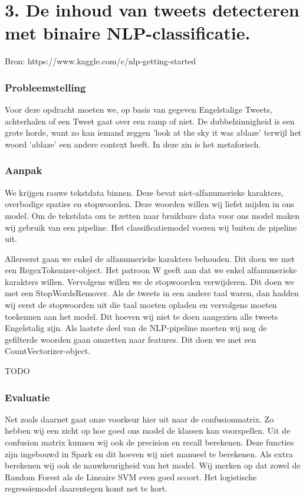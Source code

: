 \documentclass[a4paper,12pt,twoside]{report}
\begin{document}
\chapter*{3. De inhoud van tweets detecteren met binaire NLP-classificatie.}

Bron: https://www.kaggle.com/c/nlp-getting-started

\subsection*{Probleemstelling}

Voor deze opdracht moeten we, op basis van gegeven Engelstalige Tweets, achterhalen of een Tweet gaat over een ramp of niet. De dubbelzinnigheid is een grote horde, want zo kan iemand zeggen 'look at the sky it was ablaze' terwijl het woord 'ablaze' een andere context heeft. In deze zin is het metaforisch.

\subsection*{Aanpak}

We krijgen rauwe tekstdata binnen. Deze bevat niet-alfanumerieke karakters, overbodige spaties en stopwoorden. Deze woorden willen wij liefst mijden in ons model. Om de tekstdata om te zetten naar bruikbare data voor ons model maken wij gebruik van een pipeline. Het classificatiemodel voeren wij buiten de pipeline uit.

Allereerst gaan we enkel de alfanumerieke karakters behouden. Dit doen we met een RegexTokenizer-object. Het patroon W geeft aan dat we enkel alfanumerieke karakters willen. Vervolgens willen we de stopwoorden verwijderen. Dit doen we met een StopWordsRemover. Als de tweets in een andere taal waren, dan hadden wij eerst de stopwoorden uit die taal moeten opladen en vervolgens moeten toekennen aan het model. Dit hoeven wij niet te doen aangezien alle tweets Engelstalig zijn. Als laatste deel van de NLP-pipeline moeten wij nog de gefilterde woorden gaan omzetten naar features. Dit doen we met een CountVectorizer-object.

TODO

\subsection*{Evaluatie}

Net zoals daarnet gaat onze voorkeur hier uit naar de confusionmatrix. Zo hebben wij een zicht op hoe goed ons model de klassen kan voorspellen. Uit de confusion matrix kunnen wij ook de precision en recall berekenen. Deze functies zijn ingebouwd in Spark en dit hoeven wij niet manueel te berekenen. Als extra berekenen wij ook de nauwkeurigheid van het model. Wij merken op dat zowel de Random Forest als de Lineaire SVM even goed scoort. Het logistische regressiemodel daarentegen komt net te kort.
\end{document}
